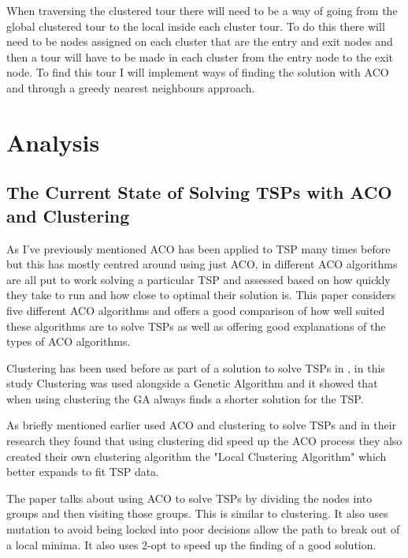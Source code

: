 When traversing the clustered tour there will need to be a way of going from the global clustered tour to the local inside each cluster tour. To do this there will need to be nodes assigned on each cluster that are the entry and exit nodes and then a tour will have to be made in each cluster from the entry node to the exit node. To find this tour I will implement ways of finding the solution with ACO and through a greedy nearest neighbours approach.

\section{Analysis}

\subsection{The Current State of Solving TSPs with ACO and Clustering}
As I've previously mentioned ACO has been applied to TSP many times before but this has mostly centred around using just ACO, in \cite{assesmentdiffacofortsp} different ACO algorithms are all put to work solving a particular TSP and assessed based on how quickly they take to run and how close to optimal their solution is. This paper considers five different ACO algorithms and offers a good comparison of how well suited these algorithms are to solve TSPs as well as offering good explanations of the types of ACO algorithms. 

Clustering has been used before as part of a solution to solve TSPs in \cite{clustering_with_local_search_heuristic}, in this study Clustering was used alongside a Genetic Algorithm and it showed that when using clustering the GA always finds a shorter solution for the TSP.

As briefly mentioned earlier \cite{pang_chao-yang_ben-qiong_zhang_jie_wei_shan_zheng-chao_2014} used ACO and clustering to solve TSPs and in their research they found that using clustering did speed up the ACO process they also created their own clustering algorithm the "Local Clustering Algorithm" which better expands to fit TSP data. 

The paper \cite{yang_shi_marchese_liang_2008} talks about using ACO to solve TSPs by dividing the nodes into groups and then visiting those groups. This is similar to clustering. It also uses mutation to avoid being locked into poor decisions allow the path to break out of a local minima. It also uses 2-opt to speed up the finding of a good solution.


